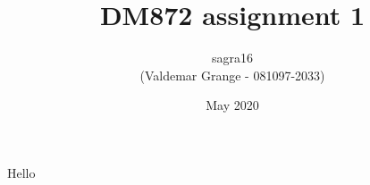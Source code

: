\documentclass{article}
\title{DM872 assignment 1}
\author{sagra16 \\(Valdemar Grange - 081097-2033) }
\date{May 2020}
\begin{document}
    \maketitle

    \clearpage

    Hello
\end{document}
